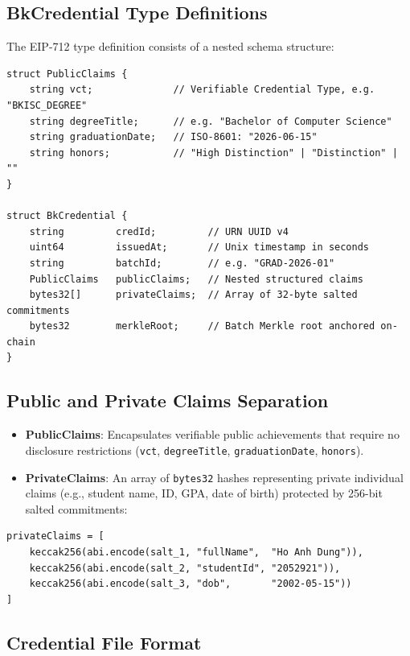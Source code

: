 \subsection{BkCredential Type Definitions}

The EIP-712 type definition consists of a nested schema structure:

\begin{lstlisting}[language=Solidity]
struct PublicClaims {
    string vct;              // Verifiable Credential Type, e.g. "BKISC_DEGREE"
    string degreeTitle;      // e.g. "Bachelor of Computer Science"
    string graduationDate;   // ISO-8601: "2026-06-15"
    string honors;           // "High Distinction" | "Distinction" | ""
}

struct BkCredential {
    string         credId;         // URN UUID v4
    uint64         issuedAt;       // Unix timestamp in seconds
    string         batchId;        // e.g. "GRAD-2026-01"
    PublicClaims   publicClaims;   // Nested structured claims
    bytes32[]      privateClaims;  // Array of 32-byte salted commitments
    bytes32        merkleRoot;     // Batch Merkle root anchored on-chain
}
\end{lstlisting}

\subsection{Public and Private Claims Separation}

\begin{itemize}
    \item \textbf{PublicClaims}: Encapsulates verifiable public achievements that require no disclosure restrictions (\texttt{vct}, \texttt{degreeTitle}, \texttt{graduationDate}, \texttt{honors}).
    \item \textbf{PrivateClaims}: An array of \texttt{bytes32} hashes representing private individual claims (e.g., student name, ID, GPA, date of birth) protected by 256-bit salted commitments:
\end{itemize}

\begin{lstlisting}
privateClaims = [
    keccak256(abi.encode(salt_1, "fullName",  "Ho Anh Dung")),
    keccak256(abi.encode(salt_2, "studentId", "2052921")),
    keccak256(abi.encode(salt_3, "dob",       "2002-05-15"))
]
\end{lstlisting}

\subsection{Credential File Format}

